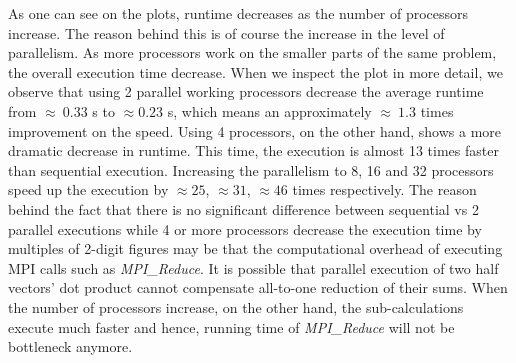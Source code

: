 \documentclass[12pt]{article}
\begin{document}
As one can see on the plots, runtime decreases as the number of processors increase. The reason behind this is of course the increase in the level of parallelism. As more processors work on the smaller parts of the same problem, the overall execution time decrease. When we inspect the plot in more detail, we observe that using 2 parallel working processors decrease the average runtime from $\approx ~0.33$ s to $\approx 0.23$ s, which means an approximately $\approx ~1.3$ times improvement on the speed. Using 4 processors, on the other hand, shows a more dramatic decrease in runtime. This time, the execution is almost 13 times faster than sequential execution. Increasing the parallelism to 8, 16 and 32 processors speed up the execution by $\approx 25$, $\approx31$, $\approx 46$ times respectively. The reason behind the fact that there is no significant difference between sequential vs 2 parallel executions while 4 or more processors decrease the execution time by multiples of 2-digit figures may be that the computational overhead of executing MPI calls such as \textit{MPI\_Reduce}. It is possible that parallel execution of two half vectors' dot product cannot compensate all-to-one reduction of their sums. When the number of processors increase, on the other hand, the sub-calculations execute much faster and hence, running time of \textit{MPI\_Reduce} will not be bottleneck anymore.
\end{document}

